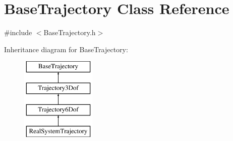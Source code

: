 \hypertarget{class_base_trajectory}{}\section{Base\+Trajectory Class Reference}
\label{class_base_trajectory}


{\ttfamily \#include $<$Base\+Trajectory.\+h$>$}

Inheritance diagram for Base\+Trajectory\+:\begin{figure}[H]
\begin{center}
\leavevmode
\includegraphics[height=4.000000cm]{class_base_trajectory}
\end{center}
\end{figure}

